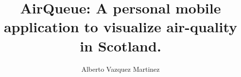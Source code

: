 \documentclass[bsc,logo, abbrevs]{infthesis}
\title{AirQueue: A personal mobile application to visualize air-quality in Scotland.}
\author{Alberto Vazquez Martinez}
\begin{document}
\begin{preliminary}

\maketitle

\standarddeclaration
\dedication{Acknowledgements}
\tableofcontents
\listoffigures
\iffalse
\listoftables
\begin{accron}\end{accron}
\fi
\end{preliminary}












\end{document}
